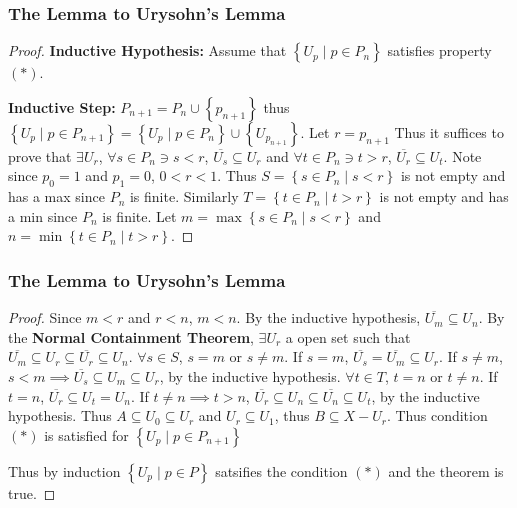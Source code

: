 \documentclass{beamer}
\newcommand*{\subeq}{\subseteq}
\begin{document}
\begin{frame}
    \frametitle{The Lemma to Urysohn's Lemma}

    \begin{proof}
        \renewcommand{\qedsymbol}{}

        \textbf{Inductive Hypothesis:} Assume that $\left\{ U_p \mid p \in P_n \right\}$ satisfies property $(*)$. 
        \bigskip

        \textbf{Inductive Step:} $P_{n + 1} = P_{n} \cup \left\{ p_{n + 1} \right\}$ thus $\left\{ U_p \mid p \in P_{n + 1} \right\} = \left\{ U_p \mid p \in P_n \right\} \cup \left\{ U_{p_{n + 1}} \right\}$. Let $r = p_{n + 1}$  Thus it suffices to prove that $\exists U_{r}$, $\forall s \in P_n \ni s < r$, $\overline{U_s} \subeq U_r$ and $\forall t \in P_n \ni t > r$, $\overline{U_r} \subeq U_t$. Note since $p_0 = 1$ and $p_1 = 0$, $0 < r < 1$. Thus $S = \left\{ s \in P_n \mid s < r \right\}$ is not empty and has a max since $P_n$ is finite. Similarly $T = \left\{ t \in P_n \mid t > r \right\}$ is not empty and has a min since $P_n$ is finite. Let $m = \max \left\{ s \in P_n \mid s < r \right\}$ and $n = \min \left\{ t \in P_n \mid t > r \right\}$.   
    \end{proof}

\end{frame}

\begin{frame}
    \frametitle{The Lemma to Urysohn's Lemma}

    \begin{proof}
        
        Since $m < r$ and $r < n$, $m < n$. By the inductive hypothesis, $\overline{U_m} \subeq U_n$. By the \textbf{Normal Containment Theorem}, $\exists U_r$ a open set such that $\overline{U_m} \subeq U_r \subeq \overline{U_r} \subeq U_n$. $\forall s \in S$, $s = m$ or $s \neq m$. If $s = m$, $\overline{U_s} = \overline{U_m} \subeq U_r$. If $s \neq m$, $s < m \implies \overline{U_s} \subeq U_m \subeq U_r$, by the inductive hypothesis. $\forall t \in T$, $t = n$ or $t \neq n$. If $t = n$, $\overline{U_r} \subeq U_t = U_n$. If $t \neq n \implies t > n$, $\overline{U_r} \subeq U_n \subeq \overline{U_n} \subeq U_t$, by the inductive hypothesis. Thus $A \subeq U_0 \subeq U_r$ and $U_r \subeq U_1$, thus $B \subeq X - U_r$. Thus condition $(*)$ is satisfied for $\left\{ U_p \mid p \in P_{n + 1} \right\}$
        
    \bigskip
    Thus by induction $\left\{ U_p \mid p \in P \right\}$ satsifies the condition $(*)$ and the theorem is true.   
    \end{proof}

\end{frame}
\end{document}
